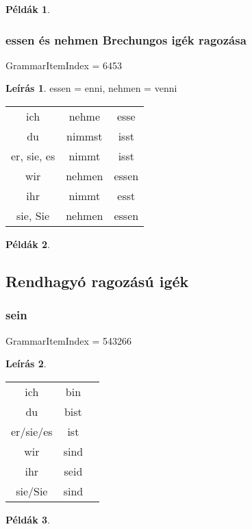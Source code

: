 \documentclass{article}
\theoremstyle{definition}
\newtheorem*{exmp}{Példák}
\newtheorem*{desc}{Leírás}
\begin{document}
\begin{exmp}
\end{exmp}

\subsubsection{essen és nehmen Brechungos igék ragozása}

GrammarItemIndex = 6453

\begin{desc}
essen = enni, nehmen = venni

\begin{tabular}{ccc}
ich & nehme & esse \\
du & nimmst & isst \\
er, sie, es & nimmt & isst \\
wir & nehmen & essen \\
ihr & nimmt & esst \\
sie, Sie & nehmen & essen \\
\end{tabular}
\end{desc}

\begin{exmp}
\end{exmp}

\subsection{Rendhagyó ragozású igék}

\subsubsection{sein}

GrammarItemIndex = 543266

\begin{desc}
\begin{tabular}{ccc}
 ich & bin \\
 du & bist \\
 er/sie/es & ist \\
 wir & sind \\
 ihr & seid \\
 sie/Sie & sind \\
\end{tabular}
\end{desc}

\begin{exmp}
\end{exmp}
\end{document}
